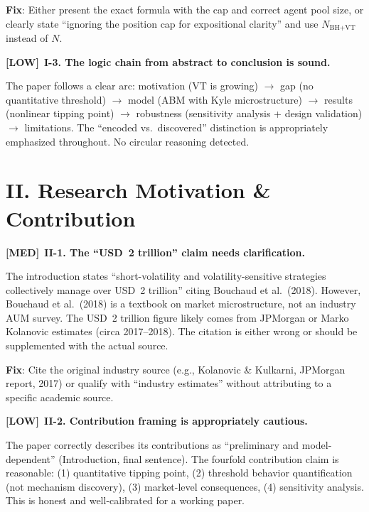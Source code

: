 \documentclass[12pt,a4paper]{article}
\newcommand{\MED}{\textbf{\textcolor{warncolor}{[MED]}}}
\newcommand{\LOW}{\textbf{\textcolor{okgreen}{[LOW]}}}
\begin{document}
\textbf{Fix}: Either present the exact formula with the cap and correct agent pool size, or clearly state ``ignoring the position cap for expositional clarity'' and use $N_{\text{BH+VT}}$ instead of $N$.

\medskip

\LOW\ \textbf{I-3. The logic chain from abstract to conclusion is sound.}

The paper follows a clear arc: motivation (VT is growing) $\to$ gap (no quantitative threshold) $\to$ model (ABM with Kyle microstructure) $\to$ results (nonlinear tipping point) $\to$ robustness (sensitivity analysis + design validation) $\to$ limitations. The ``encoded vs.\ discovered'' distinction is appropriately emphasized throughout. No circular reasoning detected.


\section*{II. Research Motivation \& Contribution}

\MED\ \textbf{II-1. The ``USD~2 trillion'' claim needs clarification.}

The introduction states ``short-volatility and volatility-sensitive strategies collectively manage over USD~2 trillion'' citing Bouchaud et al.\ (2018). However, Bouchaud et al.\ (2018) is a textbook on market microstructure, not an industry AUM survey. The USD~2 trillion figure likely comes from JPMorgan or Marko Kolanovic estimates (circa 2017--2018). The citation is either wrong or should be supplemented with the actual source.

\textbf{Fix}: Cite the original industry source (e.g., Kolanovic \& Kulkarni, JPMorgan report, 2017) or qualify with ``industry estimates'' without attributing to a specific academic source.

\medskip

\LOW\ \textbf{II-2. Contribution framing is appropriately cautious.}

The paper correctly describes its contributions as ``preliminary and model-dependent'' (Introduction, final sentence). The fourfold contribution claim is reasonable: (1) quantitative tipping point, (2) threshold behavior quantification (not mechanism discovery), (3) market-level consequences, (4) sensitivity analysis. This is honest and well-calibrated for a working paper.
\end{document}
